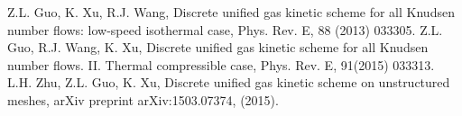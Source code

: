 \begin{thebibliography}{99}
 Z.L. Guo, K. Xu, R.J. Wang, Discrete unified gas kinetic scheme for all Knudsen number flows: low-speed isothermal case, Phys. Rev. E, 88 (2013) 033305.
 Z.L. Guo, R.J. Wang, K. Xu, Discrete unified gas kinetic scheme for all Knudsen number flows. II. Thermal compressible case, Phys. Rev. E, 91(2015) 033313.
 L.H. Zhu, Z.L. Guo, K. Xu, Discrete unified gas kinetic scheme on unstructured meshes, arXiv preprint arXiv:1503.07374, (2015).
\end{thebibliography}


%

